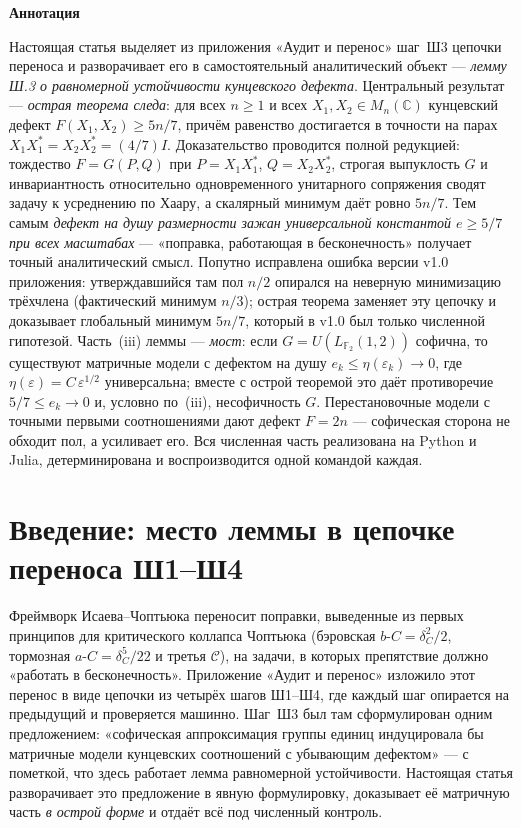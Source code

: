 \documentclass[11pt,a4paper]{article}
\theoremstyle{plain}
\theoremstyle{definition}
\theoremstyle{remark}
\begin{document}

\tableofcontents
\newpage

\begin{center}
{\Large\bfseries Аннотация}\par\medskip
\end{center}
\noindent
Настоящая статья выделяет из приложения «Аудит и перенос» шаг~Ш3 цепочки
переноса и разворачивает его в самостоятельный аналитический объект —
\emph{лемму Ш.3 о равномерной устойчивости кунцевского дефекта}. Центральный
результат — \emph{острая теорема следа}: для всех $n\ge 1$ и всех
$X_1,X_2\in M_n(\mathbb{C})$ кунцевский дефект
$F(X_1,X_2)\ge 5n/7$, причём равенство достигается в точности на парах
$X_1X_1^*=X_2X_2^*=(4/7)I$. Доказательство проводится полной редукцией:
тождество $F=G(P,Q)$ при $P=X_1X_1^*$, $Q=X_2X_2^*$, строгая выпуклость
$G$ и инвариантность относительно одновременного унитарного сопряжения
сводят задачу к усреднению по Хаару, а скалярный минимум даёт ровно
$5n/7$. Тем самым \emph{дефект на душу размерности зажан универсальной
константой $e\ge 5/7$ при всех масштабах} — «поправка, работающая в
бесконечность» получает точный аналитический смысл. Попутно исправлена
ошибка версии v1.0 приложения: утверждавшийся там пол $n/2$ опирался на
неверную минимизацию трёхчлена (фактический минимум $n/3$); острая
теорема заменяет эту цепочку и доказывает глобальный минимум $5n/7$,
который в v1.0 был только численной гипотезой. Часть~(iii) леммы —
\emph{мост}: если $G=U(L_{\mathbb{F}_2}(1,2))$ софична, то существуют
матричные модели с дефектом на душу $e_k\le\eta(\varepsilon_k)\to 0$,
где $\eta(\varepsilon)=C\,\varepsilon^{1/2}$ универсальна; вместе с
острой теоремой это даёт противоречие $5/7\le e_k\to 0$ и, условно
по~(iii), несофичность $G$. Перестановочные модели с точными первыми
соотношениями дают дефект $F=2n$ — софическая сторона не обходит пол, а
усиливает его. Вся численная часть реализована на Python и Julia,
детерминирована и воспроизводится одной командой каждая.

\section{Введение: место леммы в цепочке переноса Ш1--Ш4}\label{sec:intro}

Фреймворк Исаева--Чоптьюка переносит поправки, выведенные из первых
принципов для критического коллапса Чоптьюка (бэровская
$b\text{-}C=\delta_C^2/2$, тормозная $a\text{-}C=\delta_C^5/22$ и третья
$\mathcal C$), на задачи, в которых препятствие должно «работать в
бесконечность». Приложение «Аудит и перенос» изложило этот перенос в виде
цепочки из четырёх шагов Ш1--Ш4, где каждый шаг опирается на предыдущий и
проверяется машинно. Шаг~Ш3 был там сформулирован одним предложением:
«софическая аппроксимация группы единиц индуцировала бы матричные модели
кунцевских соотношений с убывающим дефектом» — с пометкой, что здесь
работает лемма равномерной устойчивости. Настоящая статья разворачивает
это предложение в явную формулировку, доказывает её матричную часть
\emph{в острой форме} и отдаёт всё под численный контроль.
\end{document}
